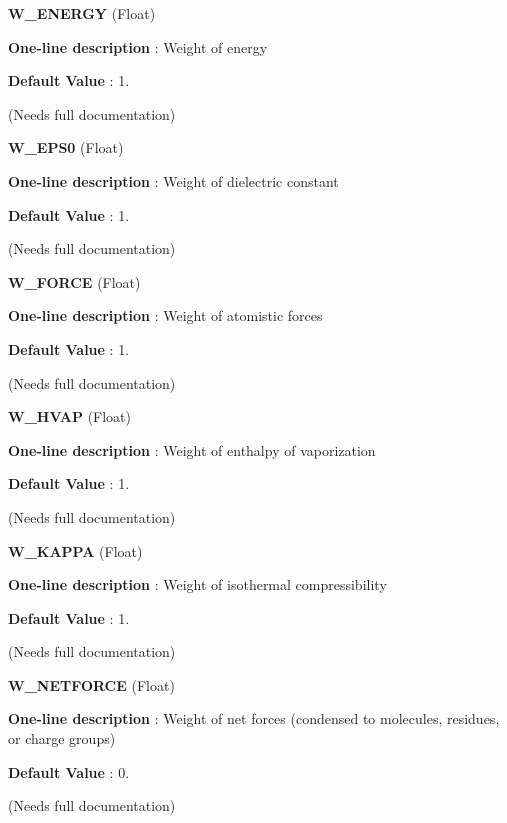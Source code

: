 \begin{DoxyItemize}
\item {\bfseries  \-W\-\_\-\-E\-N\-E\-R\-G\-Y } (\-Float) \par
{\bfseries  \-One-\/line description }\-: \-Weight of energy \par
{\bfseries  \-Default \-Value }\-: 1. \par
(\-Needs full documentation)\end{DoxyItemize}
\begin{DoxyItemize}
\item {\bfseries  \-W\-\_\-\-E\-P\-S0 } (\-Float) \par
{\bfseries  \-One-\/line description }\-: \-Weight of dielectric constant \par
{\bfseries  \-Default \-Value }\-: 1. \par
(\-Needs full documentation)\end{DoxyItemize}
\begin{DoxyItemize}
\item {\bfseries  \-W\-\_\-\-F\-O\-R\-C\-E } (\-Float) \par
{\bfseries  \-One-\/line description }\-: \-Weight of atomistic forces \par
{\bfseries  \-Default \-Value }\-: 1. \par
(\-Needs full documentation)\end{DoxyItemize}
\begin{DoxyItemize}
\item {\bfseries  \-W\-\_\-\-H\-V\-A\-P } (\-Float) \par
{\bfseries  \-One-\/line description }\-: \-Weight of enthalpy of vaporization \par
{\bfseries  \-Default \-Value }\-: 1. \par
(\-Needs full documentation)\end{DoxyItemize}
\begin{DoxyItemize}
\item {\bfseries  \-W\-\_\-\-K\-A\-P\-P\-A } (\-Float) \par
{\bfseries  \-One-\/line description }\-: \-Weight of isothermal compressibility \par
{\bfseries  \-Default \-Value }\-: 1. \par
(\-Needs full documentation)\end{DoxyItemize}
\begin{DoxyItemize}
\item {\bfseries  \-W\-\_\-\-N\-E\-T\-F\-O\-R\-C\-E } (\-Float) \par
{\bfseries  \-One-\/line description }\-: \-Weight of net forces (condensed to molecules, residues, or charge groups) \par
{\bfseries  \-Default \-Value }\-: 0. \par
(\-Needs full documentation)\end{DoxyItemize}
